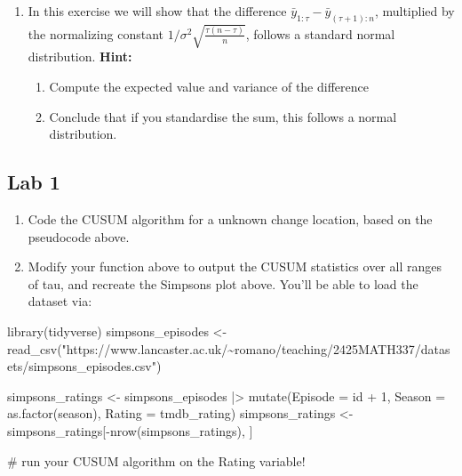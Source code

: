 \documentclass[
  letterpaper,
  DIV=11,
  numbers=noendperiod]{scrreprt}
\newenvironment{Shaded}{\begin{snugshade}}{\end{snugshade}}
\newcommand{\AttributeTok}[1]{\textcolor[rgb]{0.40,0.45,0.13}{#1}}
\newcommand{\CommentTok}[1]{\textcolor[rgb]{0.37,0.37,0.37}{#1}}
\newcommand{\DecValTok}[1]{\textcolor[rgb]{0.68,0.00,0.00}{#1}}
\newcommand{\FunctionTok}[1]{\textcolor[rgb]{0.28,0.35,0.67}{#1}}
\newcommand{\NormalTok}[1]{\textcolor[rgb]{0.00,0.23,0.31}{#1}}
\newcommand{\OtherTok}[1]{\textcolor[rgb]{0.00,0.23,0.31}{#1}}
\newcommand{\SpecialCharTok}[1]{\textcolor[rgb]{0.37,0.37,0.37}{#1}}
\newcommand{\StringTok}[1]{\textcolor[rgb]{0.13,0.47,0.30}{#1}}
\begin{document}
\begin{enumerate}
\def\labelenumi{\arabic{enumi}.}
\setcounter{enumi}{1}
\item
  In this exercise we will show that the difference
  \(\bar{y}_{1:\tau} - \bar{y}_{(\tau+1):n}\), multiplied by the
  normalizing constant \(1/\sigma^2\sqrt{\frac{\tau(n-\tau)}{n}}\),
  follows a standard normal distribution. \textbf{Hint:}

  \begin{enumerate}
  \def\labelenumii{\alph{enumii}.}
  \item
    Compute the expected value and variance of the difference
  \item
    Conclude that if you standardise the sum, this follows a normal
    distribution.
  \end{enumerate}
\end{enumerate}

\subsection{Lab 1}\label{lab-1}

\begin{enumerate}
\def\labelenumi{\arabic{enumi}.}
\item
  Code the CUSUM algorithm for a unknown change location, based on the
  pseudocode above.
\item
  Modify your function above to output the CUSUM statistics over all
  ranges of tau, and recreate the Simpsons plot above. You'll be able to
  load the dataset via:
\end{enumerate}

\begin{Shaded}
\begin{Highlighting}[]
\FunctionTok{library}\NormalTok{(tidyverse)}
\NormalTok{simpsons\_episodes }\OtherTok{\textless{}{-}} \FunctionTok{read\_csv}\NormalTok{(}\StringTok{"https://www.lancaster.ac.uk/\textasciitilde{}romano/teaching/2425MATH337/datasets/simpsons\_episodes.csv"}\NormalTok{)}

\NormalTok{simpsons\_ratings }\OtherTok{\textless{}{-}}\NormalTok{ simpsons\_episodes }\SpecialCharTok{|\textgreater{}} 
  \FunctionTok{mutate}\NormalTok{(}\AttributeTok{Episode =}\NormalTok{ id }\SpecialCharTok{+} \DecValTok{1}\NormalTok{, }\AttributeTok{Season =} \FunctionTok{as.factor}\NormalTok{(season), }\AttributeTok{Rating =}\NormalTok{ tmdb\_rating)}
\NormalTok{simpsons\_ratings }\OtherTok{\textless{}{-}}\NormalTok{ simpsons\_ratings[}\SpecialCharTok{{-}}\FunctionTok{nrow}\NormalTok{(simpsons\_ratings), ]}

\CommentTok{\# run your CUSUM algorithm on the Rating variable!}
\end{Highlighting}
\end{Shaded}
\end{document}
